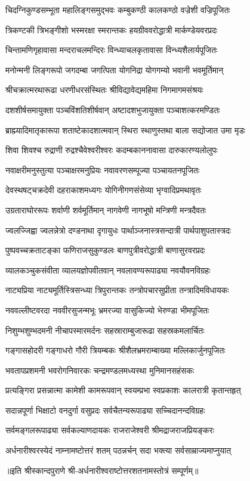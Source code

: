 \twolineshloka
{चिदग्निकुण्डसम्भूता महालिङ्गसमुद्भवः}
{कम्बुकण्ठी कालकण्ठो वज्रेशी वज्रिपूजितः}%

\twolineshloka
{त्रिकण्टकी त्रिभङ्गीशो भस्मरक्षा स्मरान्तकः}
{हयग्रीववरोद्धात्री मार्कण्डेयवरप्रदः}%

\twolineshloka
{चिन्तामणिगृहावासा मन्दराचलमन्दिरः}
{विन्ध्याचलकृतावासा विन्ध्यशैलार्यपूजितः}%

\twolineshloka
{मनोन्मनी लिङ्गरूपो जगदम्बा जगत्पिता}
{योगनिद्रा योगगम्यो भवानी भवमूर्तिमान्}%

\twolineshloka
{श्रीचक्रात्मरथारूढा धरणीधरसंस्थितः}
{श्रीविद्यावेद्यमहिमा निगमागमसंश्रयः}%

\twolineshloka
{दशशीर्षसमायुक्ता पञ्चविंशतिशीर्षवान्}
{अष्टादशभुजायुक्ता पञ्चाशत्करमण्डितः}%

\twolineshloka
{ब्राह्म्यादिमातृकारूपा शताष्टेकादशात्मवान्}
{स्थिरा स्थाणुस्तथा बाला सद्योजात उमा मृडः}%

\twolineshloka
{शिवा शिवश्च रुद्राणी रुद्रश्चैवेश्वरीश्वरः}
{कदम्बकाननावासा दारुकारण्यलोलुपः}%

\twolineshloka
{नवाक्षरीमनुस्तुत्या पञ्चाक्षरमनुप्रियः}
{नवावरणसम्पूज्या पञ्चायतनपूजितः}%

\twolineshloka
{देवस्थषट्चक्रदेवी दहराकाशमध्यगः}
{योगिनीगणसंसेव्या भृग्वादिप्रमथावृतः}%

\twolineshloka
{उग्रताराघोररूपः शर्वाणी शर्वमूर्तिमान्}
{नागवेणी नागभूषो मन्त्रिणी मन्त्रदैवतः}%

\twolineshloka
{ज्वलज्जिह्वा ज्वलन्नेत्रो दण्डनाथा दृगायुधः}
{पार्थाञ्जनास्त्रसन्दात्री पार्थपाशुपतास्त्रदः}%

\twolineshloka
{पुष्पवच्चक्रताटङ्का फणिराजसुकुण्डलः}
{बाणपुत्रीवरोद्धात्री बाणासुरवरप्रदः}%

\twolineshloka
{व्यालकञ्चुकसंवीता व्यालयज्ञोपवीतवान्}
{नवलावण्यरूपाढ्या नवयौवनविग्रहः}%

\twolineshloka
{नाट्यप्रिया नाट्यमूर्तिस्त्रिसन्ध्या त्रिपुरान्तकः}
{तन्त्रोपचारसुप्रीता तन्त्रादिमविधायकः}%

\twolineshloka
{नववल्लीष्टवरदा नववीरसुजन्मभूः}
{भ्रमरज्या वासुकिज्यो भेरुण्डा भीमपूजितः}%

\twolineshloka
{निशुम्भशुम्भदमनी नीचापस्मारमर्दनः}
{सहस्राराम्बुजारूढा सहस्रकमलार्चितः}%

\twolineshloka
{गङ्गासहोदरी गङ्गाधरो गौरी त्रियम्बकः}
{श्रीशैलभ्रमराम्बाख्या मल्लिकार्जुनपूजितः}%

\twolineshloka
{भवतापप्रशमनी भवरोगनिवारकः}
{चन्द्रमण्डलमध्यस्था मुनिमानसहंसकः}%

\twolineshloka
{प्रत्यङ्गिरा प्रसन्नात्मा कामेशी कामरूपवान्}
{स्वयम्प्रभा स्वप्रकाशः कालरात्री कृतान्तहृत्}%

\twolineshloka
{सदान्नपूर्णा भिक्षाटो वनदुर्गा वसुप्रदः}
{सर्वचैतन्यरूपाढ्या सच्चिदानन्दविग्रहः}%

\twolineshloka
{सर्वमङ्गलरूपाढ्या सर्वकल्याणदायकः}
{राजराजेश्वरी श्रीमद्राजराजप्रियङ्करः}%

\twolineshloka
{अर्धनारीश्वरस्येदं नाम्नामष्टोत्तरं शतम्}
{पठन्नर्चन् सदा भक्त्या सर्वसाम्राज्यमाप्नुयात्}%

॥इति श्रीस्कान्दपुराणे श्री-अर्धनारीश्वराष्टोत्तरशतनामस्तोत्रं सम्पूर्णम्॥